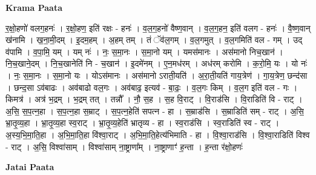 \documentclass[17pt]{extarticle}
\begin{document}
\textbf{Krama Paata} \newline

र॒क्षो॒हणो॑ वलग॒हनः॑ । र॒क्षो॒हण॒ इति॑ रक्षः - हनः॑ । व॒ल॒ग॒हनो॑ वैष्ण॒वान् । व॒ल॒ग॒हन॒ इति॑ वलग - हनः॑ । वै॒ष्ण॒वान् ख॑नामि । ख॒ना॒मी॒दम् । इ॒दम॒हम् । अ॒हम् तम् । तं ॅव॑ल॒गम् । व॒ल॒गमुत् । व॒ल॒गमिति॑ वल - गम् । उद् व॑पामि । व॒पा॒मि॒ यम् । यम् नः॑ । नः॒ स॒मा॒नः । स॒मा॒नो यम् । यमस॑मानः । अस॑मानो निच॒खान॑ । नि॒च॒खाने॒दम् । नि॒च॒खानेति॑ नि - च॒खान॑ । इ॒दमे॑नम् । ए॒न॒मध॑रम् । अध॑रम् करोमि । क॒रो॒मि॒ यः । यो नः॑ । नः॒ स॒मा॒नः । स॒मा॒नो यः । योऽस॑मानः । अस॑मानो ऽराती॒यति॑ । अ॒रा॒ती॒यति॑ गाय॒त्रेण॑ । गा॒य॒त्रेण॒ छन्द॑सा । छन्द॒सा ऽव॑बाढः । अव॑बाढो वल॒गः । अव॑बाढ॒ इत्यव॑ - बा॒ढः॒ । व॒ल॒गः किम् । व॒ल॒ग इति॑ वल - गः । किमत्र॑ । अत्र॑ भ॒द्रम् । भ॒द्रम् तत् । तन्नौ᳚ । नौ॒ स॒ह । स॒ह वि॒राट् । वि॒राड॑सि । वि॒राडिति॑ वि - राट् । अ॒सि॒ स॒प॒त्न॒हा । स॒प॒त्न॒हा स॒म्राट् । स॒प॒त्न॒हेति॑ सपत्न - हा । स॒म्राड॑सि । स॒म्राडिति॑ सम् - राट् । अ॒सि॒ भ्रा॒तृ॒व्य॒हा । भ्रा॒तृ॒व्य॒हा स्व॒राट् । भ्रा॒तृ॒व्य॒हेति॑ भ्रातृव्य - हा । स्व॒राड॑सि । स्व॒राडिति॑ स्व - राट् । अ॒स्य॒भि॒मा॒ति॒हा । अ॒भि॒मा॒ति॒हा वि॑श्वा॒राट् । 
अ॒भि॒मा॒ति॒हेत्य॑भिमाति - हा । वि॒श्वा॒राड॑सि । वि॒श्वा॒राडिति॑ विश्व - राट् । अ॒सि॒ विश्वा॑साम् । विश्वा॑साम् ना॒ष्ट्राणा᳚म् । ना॒ष्ट्राणाꣳ॑ ह॒न्ता । ह॒न्ता र॑क्षो॒हणः॑ \newline

\textbf{Jatai Paata} \newline
\end{document}
